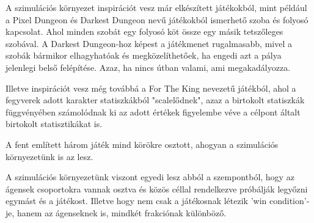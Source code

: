 

A szimulációs környezet inspirációt vesz már elkészített játékokból, mint például a Pixel Dungeon és Darkest Dungeon
nevű játékokból ismerhető szoba és folyosó kapcsolat. Ahol minden szobát egy folyosó köt össze egy másik tetszőleges szobával.
A Darkest Dungeon-hoz képest a játékmenet rugalmasabb, mivel a szobák bármikor elhagyhatóak és megközelíthetőek, ha engedi azt a pálya jelenlegi belső felépítése.
Azaz, ha nincs útban valami, ami megakadályozza.

Illetve inspirációt vesz még továbbá a For The King nevezetű játékból, ahol a fegyverek adott karakter statiszkákból "scalelődnek", azaz a birtokolt statiszkák függvényében
számolódnak ki az adott értékek figyelembe véve a célpont általt birtokolt statisztikákat is.

A fent említett három játék mind körökre osztott, ahogyan a szimulációs környezetünk is az lesz.

A szimulációs környezetünk viszont egyedi lesz abból a szempontból, hogy az ágensek csoportokra vannak osztva és közös céllal rendelkezve próbálják legyőzni egymást és a játékost.
Illetve hogy nem csak a játékosnak létezik 'win condition'-je, hanem az ágenseknek is, mindkét frakciónak különböző.

\iffalse
A hivatkozások jelentős része ehhez a fejezethez szokott kötődni.
(Egy hivatkozás például így néz ki \cite{coombs1987markup}.)
Itt lehet bemutatni a hasonló alkalmazásokat.
\fi


